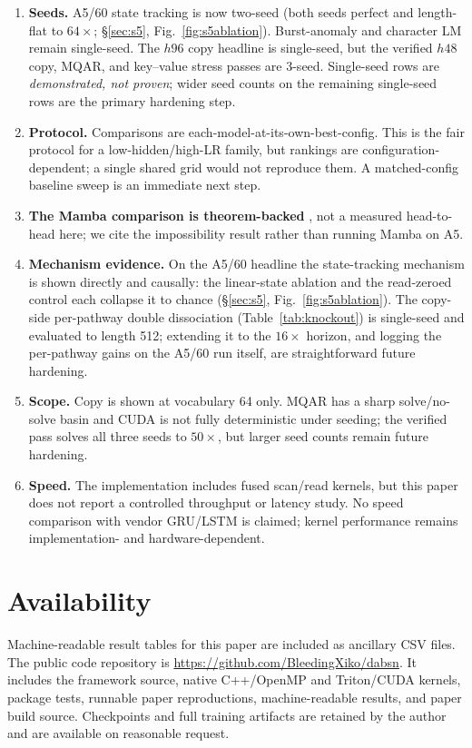 \documentclass[11pt]{article}
\begin{document}
\begin{enumerate}
\item \textbf{Seeds.} A5/60 state tracking is now two-seed (both seeds perfect
and length-flat to $64\times$; \S\ref{sec:s5}, Fig.~\ref{fig:s5ablation}).
Burst-anomaly and character LM remain single-seed. The $h96$ copy headline is
single-seed, but the verified $h48$ copy, MQAR, and key--value stress passes
are 3-seed. Single-seed rows are \emph{demonstrated, not proven}; wider seed
counts on the remaining single-seed rows are the primary hardening step.
\item \textbf{Protocol.} Comparisons are each-model-at-its-own-best-config.
This is the fair protocol for a low-hidden/high-LR family, but rankings are
configuration-dependent; a single shared grid would not reproduce them. A
matched-config baseline sweep is an immediate next step.
\item \textbf{The Mamba comparison is theorem-backed}
\citep{merrill2024illusion}, not a measured head-to-head here; we cite the
impossibility result rather than running Mamba on A5.
\item \textbf{Mechanism evidence.} On the A5/60 headline the state-tracking
mechanism is shown directly and causally: the linear-state ablation and the
read-zeroed control each collapse it to chance (\S\ref{sec:s5},
Fig.~\ref{fig:s5ablation}). The copy-side per-pathway double dissociation
(Table~\ref{tab:knockout}) is single-seed and evaluated to length 512;
extending it to the $16\times$ horizon, and logging the per-pathway gains on
the A5/60 run itself, are straightforward future hardening.
\item \textbf{Scope.} Copy is shown at vocabulary 64 only. MQAR has a sharp
solve/no-solve basin and CUDA is not fully deterministic under seeding; the
verified pass solves all three seeds to $50\times$, but larger seed counts
remain future hardening.
\item \textbf{Speed.} The implementation includes fused scan/read kernels,
but this paper does not report a controlled throughput or latency study. No
speed comparison with vendor GRU/LSTM is claimed; kernel performance remains
implementation- and hardware-dependent.
\end{enumerate}

\section{Availability}

Machine-readable result tables for this paper are included as ancillary CSV
files. The public code repository is
\url{https://github.com/BleedingXiko/dabsn}. It includes the framework source,
native C++/OpenMP and Triton/CUDA kernels, package tests, runnable paper
reproductions, machine-readable results, and paper build source. Checkpoints
and full training artifacts are retained by the author and are available on
reasonable request.



\end{document}

